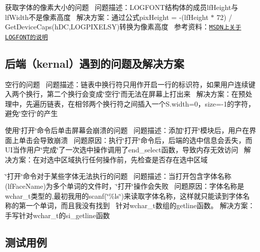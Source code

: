 \begin{DoxyEnumerate}
\item 获取字体的像素大小的问题~\newline
问题描述：{\ttfamily L\+O\+G\+F\+O\+NT}结构体的成员{\ttfamily lf\+Height}与{\ttfamily lf\+Width}不是像素高度~\newline
解决方案：通过公式{\ttfamily pix\+Height = -\/(lf\+Height $\ast$ 72) / Get\+Device\+Caps(h\+D\+C,\+L\+O\+G\+P\+I\+X\+E\+L\+S\+Y)}转换为像素高度~\newline
参考资料：\href{https://msdn.microsoft.com/zh-cn/library/bb773327.aspx}{\tt M\+S\+D\+N上关于\+L\+O\+G\+F\+O\+N\+T的说明}~\newline

\end{DoxyEnumerate}

\subsection*{后端（kernal）遇到的问题及解决方案 }


\begin{DoxyEnumerate}
\item 空行的问题~\newline
问题描述：链表中换行符只用作开启一行的标识符，如果用户连续键入两个换行，第二个换行会变成\char`\"{}空行\char`\"{}而无法在屏幕上打出来~\newline
解决方案：在预处理中，先遍历链表，在相邻两个换行符之间插入一个{\ttfamily S.\+width}=0，{\ttfamily size}=-\/1的字符，避免\char`\"{}空行\char`\"{}的产生~\newline

\item 使用\char`\"{}打开\char`\"{}命令后单击屏幕会崩溃的问题~\newline
问题描述：添加\char`\"{}打开\char`\"{}模块后，用户在界面上单击会导致崩溃~\newline
问题原因：执行\char`\"{}打开\char`\"{}命令后，后端的选中信息会丢失，而\+U\+I当作用户\char`\"{}完成\char`\"{}了一次选中操作调用了{\ttfamily end\+\_\+select}函数，导致内存无效访问~\newline
解决方案：在对选中区域执行任何操作前，先检查是否存在选中区域~\newline

\item \char`\"{}打开\char`\"{}命令对于某些字体无法执行的问题~\newline
问题描述：当打开包含字体名称({\ttfamily lf\+Face\+Name})为多个单词的文件时，\char`\"{}打开\char`\"{}操作会失败~\newline
问题原因：字体名称是{\ttfamily wchar\+\_\+t}类型的,最初我用的scanf(\char`\"{}\%ls\char`\"{})来读取字体名称，这样就只能读到字体名称的第一个单词，而且我没有找到~\newline
针对{\ttfamily wchar\+\_\+t}数组的getline函数。 解决方案：手写针对{\ttfamily wchar\+\_\+t}的{\ttfamily si\+\_\+getline}函数~\newline
 \subsection*{测试用例 }
\end{DoxyEnumerate}


